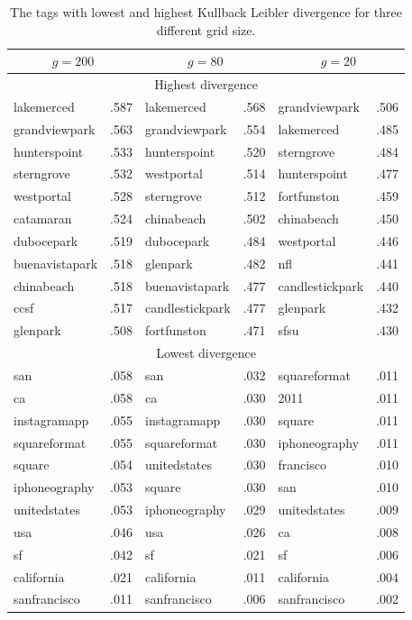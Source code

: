 \begin{table}[ht]
\centering
\setlength{\tabcolsep}{1.2em}
\begin{tabular}{lclclc}
\toprule
 \multicolumn{2}{c}{$g=200$}&  \multicolumn{2}{c}{$g=80$}&  \multicolumn{2}{c}{$g=20$}  \\
\midrule
\multicolumn{6}{c}{Highest divergence} \\
\midrule
lakemerced     & .587 & lakemerced      & .568 & grandviewpark   & .506 \\
grandviewpark  & .563 & grandviewpark   & .554 & lakemerced      & .485 \\
hunterspoint   & .533 & hunterspoint    & .520 & sterngrove      & .484 \\
sterngrove     & .532 & westportal      & .514 & hunterspoint    & .477 \\
westportal     & .528 & sterngrove      & .512 & fortfunston     & .459 \\
catamaran      & .524 & chinabeach      & .502 & chinabeach      & .450 \\
dubocepark     & .519 & dubocepark      & .484 & westportal      & .446 \\
buenavistapark & .518 & glenpark        & .482 & nfl             & .441 \\
chinabeach     & .518 & buenavistapark  & .477 & candlestickpark & .440 \\
ccsf           & .517 & candlestickpark & .477 & glenpark        & .432 \\
glenpark       & .508 & fortfunston     & .471 & sfsu            & .430 \\
\midrule
\multicolumn{6}{c}{Lowest divergence} \\
\midrule
san           & .058 & san           & .032 & squareformat  & .011 \\
ca            & .058 & ca            & .030 & 2011          & .011 \\
instagramapp  & .055 & instagramapp  & .030 & square        & .011 \\
squareformat  & .055 & squareformat  & .030 & iphoneography & .011 \\
square        & .054 & unitedstates  & .030 & francisco     & .010 \\
iphoneography & .053 & square        & .030 & san           & .010 \\
unitedstates  & .053 & iphoneography & .029 & unitedstates  & .009 \\
usa           & .046 & usa           & .026 & ca            & .008 \\
sf            & .042 & sf            & .021 & sf            & .006 \\
california    & .021 & california    & .011 & california    & .004 \\
sanfrancisco  & .011 & sanfrancisco  & .006 & sanfrancisco  & .002 \\
\bottomrule
\end{tabular}
\caption{The tags with lowest and highest Kullback Leibler divergence for
	three different grid size.\label{tab:kl}}
\end{table}

